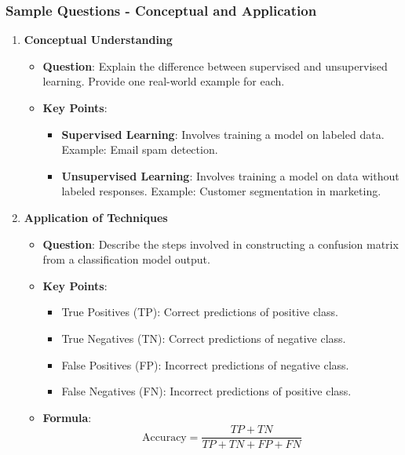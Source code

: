 \documentclass[aspectratio=169]{beamer}
\begin{document}
\begin{frame}[fragile]
    \frametitle{Sample Questions - Conceptual and Application}
    \begin{enumerate}
        \item \textbf{Conceptual Understanding}
        \begin{itemize}
            \item \textbf{Question}: Explain the difference between supervised and unsupervised learning. Provide one real-world example for each.
            \item \textbf{Key Points}:
            \begin{itemize}
                \item \textbf{Supervised Learning}: Involves training a model on labeled data. Example: Email spam detection.
                \item \textbf{Unsupervised Learning}: Involves training a model on data without labeled responses. Example: Customer segmentation in marketing.
            \end{itemize}
        \end{itemize}
        
        \item \textbf{Application of Techniques}
        \begin{itemize}
            \item \textbf{Question}: Describe the steps involved in constructing a confusion matrix from a classification model output.
            \item \textbf{Key Points}:
            \begin{itemize}
                \item True Positives (TP): Correct predictions of positive class.
                \item True Negatives (TN): Correct predictions of negative class.
                \item False Positives (FP): Incorrect predictions of negative class.
                \item False Negatives (FN): Incorrect predictions of positive class.
            \end{itemize}
            \item \textbf{Formula}:
            \begin{equation}
            \text{Accuracy} = \frac{TP + TN}{TP + TN + FP + FN}
            \end{equation}
        \end{itemize}
    \end{enumerate}
\end{frame}
\end{document}
